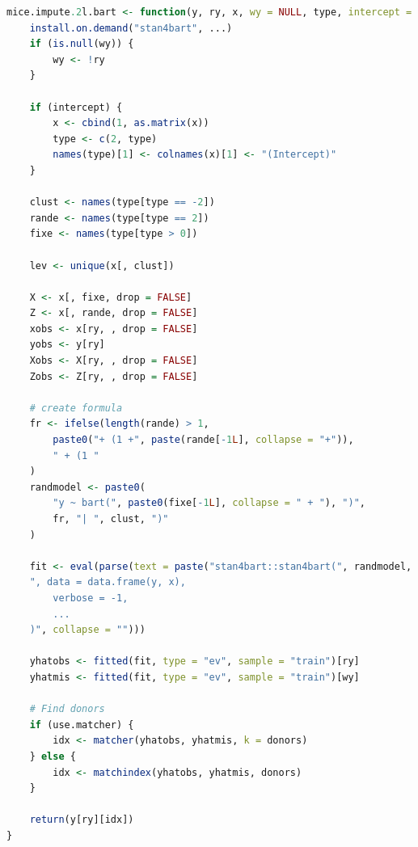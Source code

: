 \documentclass[10pt, a4paper, titlepage]{article}
\begin{document}
\begin{lstlisting}[language=R, caption={Imputation function for multilevel BART with random effects and cross-level interactions}, label={lst:multilevelBART}]
    mice.impute.2l.bart <- function(y, ry, x, wy = NULL, type, intercept = TRUE, use.matcher = FALSE, donors = 5L, ...) {
    install.on.demand("stan4bart", ...)
    if (is.null(wy)) {
        wy <- !ry
    }

    if (intercept) {
        x <- cbind(1, as.matrix(x))
        type <- c(2, type)
        names(type)[1] <- colnames(x)[1] <- "(Intercept)"
    }

    clust <- names(type[type == -2])
    rande <- names(type[type == 2])
    fixe <- names(type[type > 0])

    lev <- unique(x[, clust])

    X <- x[, fixe, drop = FALSE]
    Z <- x[, rande, drop = FALSE]
    xobs <- x[ry, , drop = FALSE]
    yobs <- y[ry]
    Xobs <- X[ry, , drop = FALSE]
    Zobs <- Z[ry, , drop = FALSE]

    # create formula
    fr <- ifelse(length(rande) > 1,
        paste0("+ (1 +", paste(rande[-1L], collapse = "+")),
        " + (1 "
    )
    randmodel <- paste0(
        "y ~ bart(", paste0(fixe[-1L], collapse = " + "), ")",
        fr, "| ", clust, ")"
    )

    fit <- eval(parse(text = paste("stan4bart::stan4bart(", randmodel, 
    ", data = data.frame(y, x),
        verbose = -1,
        ...
    )", collapse = "")))

    yhatobs <- fitted(fit, type = "ev", sample = "train")[ry]
    yhatmis <- fitted(fit, type = "ev", sample = "train")[wy]

    # Find donors
    if (use.matcher) {
        idx <- matcher(yhatobs, yhatmis, k = donors)
    } else {
        idx <- matchindex(yhatobs, yhatmis, donors)
    }

    return(y[ry][idx])
}
\end{lstlisting}

\newpage


\end{document}
